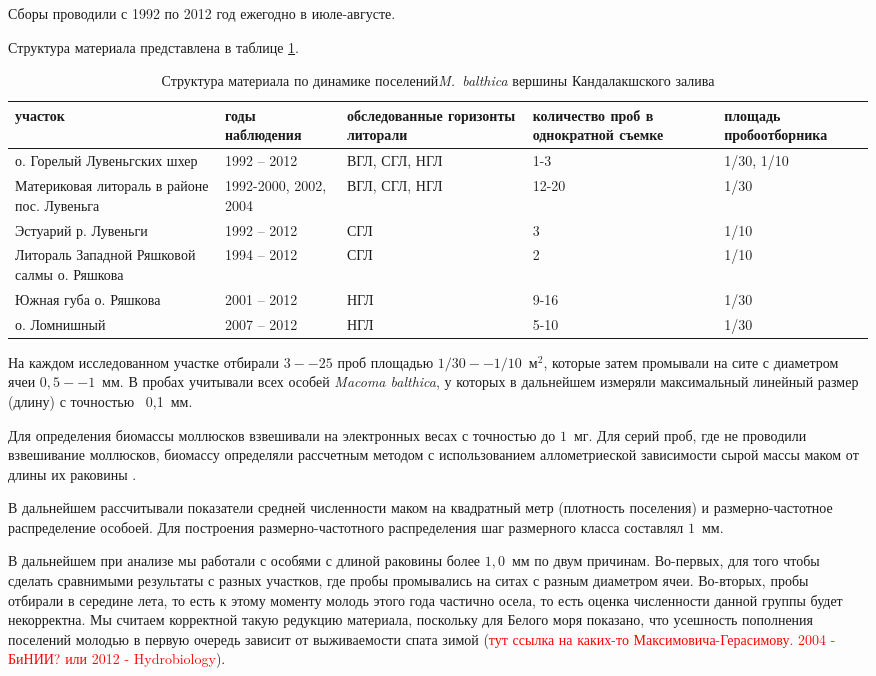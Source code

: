 \documentclass[12pt, a4paper]{disser}
\begin{document}
Сборы проводили с 1992 по 2012 год ежегодно в июле-августе.

Структура материала представлена в таблице \ref{tab:material_Kandalaksha}.
\begin{table}
\begin{tabular}{|*{5}{p{}|}} \hline
участок & годы наблюдения & обследованные горизонты литорали & количество проб в однократной съемке & площадь пробоотборника  \\ \hline
о. Горелый Лувеньгских шхер & 1992 -- 2012 & ВГЛ, СГЛ, НГЛ & 1-3 & 1/30, 1/10 \\ \hline
Материковая литораль в районе пос. Лувеньга & 1992-2000, 2002, 2004 & ВГЛ, СГЛ, НГЛ & 12-20 & 1/30 \\ \hline
Эстуарий р. Лувеньги & 1992 -- 2012 & СГЛ & 3 & 1/10 \\ \hline
Литораль Западной Ряшковой салмы о. Ряшкова & 1994 -- 2012 & СГЛ & 2 & 1/10 \\ \hline
Южная губа о. Ряшкова & 2001 -- 2012 & НГЛ & 9-16 & 1/30 \\ \hline
о. Ломнишный & 2007 -- 2012 & НГЛ & 5-10 & 1/30  \\ \hline
\end{tabular}
\caption{Структура материала по динамике поселений{\it M.~balthica} вершины Кандалакшского залива}
\label{tab:material_Kandalaksha}
\end{table}

На каждом исследованном участке отбирали $3 -- 25$ проб площадью $1/30 -- 1/10$~м$^2$, которые затем промывали на сите с диаметром ячеи $0,5 -- 1$~мм. 
В пробах учитывали всех особей {\it Macoma balthica}, у которых в дальнейшем измеряли максимальный линейный размер (длину) с точностью ~0,1~мм. 

Для определения биомассы моллюсков взвешивали на электронных весах с точностью до $1$~мг. 
Для серий проб, где не проводили взвешивание моллюсков, биомассу определяли рассчетным методом с использованием аллометриеской зависимости сырой массы маком от длины их раковины \cite{Maximovich_et_al_1993}.

В дальнейшем рассчитывали показатели средней численности маком на квадратный метр (плотность поселения) и размерно-частотное распределение особоей.
Для построения размерно-частотного распределения шаг размерного класса составлял $1$~мм.

В дальнейшем при анализе мы работали с особями с длиной раковины более $1,0$~мм по двум причинам. 
Во-первых, для того чтобы сделать сравнимыми результаты с разных участков, где пробы промывались на ситах с разным диаметром ячеи. 
Во-вторых, пробы отбирали в середине лета, то есть к этому моменту молодь этого года частично осела, то есть оценка численности данной группы будет некорректна.
Мы считаем корректной такую редукцию материала, поскольку для Белого моря показано, что усешность пополнения поселений молодью в первую очередь зависит от выживаемости спата зимой (\textcolor{red}{тут ссылка на каких-то Максимовича-Герасимову. 2004 - БиНИИ? или 2012 - Hydrobiology}).
\end{document}
